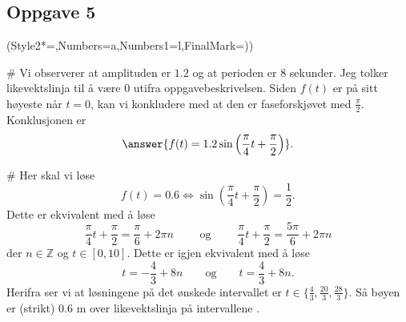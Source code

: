 \subsection*{Oppgave 5}
\begin{easylist}[enumerate]
	\ListProperties(Style2*=,Numbers=a,Numbers1=l,FinalMark={)})
	
	# Vi observerer at amplituden er $1.2$ og at perioden er $8$ sekunder. 
	Jeg tolker likevektslinja til å være $0$ utifra oppgavebeskrivelsen. 
	Siden $f(t)$ er på sitt høyeste når $t=0$, kan vi konkludere med at den er faseforskjøvet med $\frac{\pi}{2}$. 
	Konklusjonen er 
	\begin{equation*}
	\answer{f(t)=1.2\sin\left(\frac{\pi}{4}t + \frac{\pi}{2} \right)}.
	\end{equation*}
	
	
	# Her skal vi løse 
	\begin{equation*}
	f(t)=0.6 \Longleftrightarrow \sin\left(\frac\pi4 t + \frac\pi2 \right)=\frac12 .
	\end{equation*}
	Dette er ekvivalent med å løse 
	\begin{equation*}
	\frac\pi4 t + \frac\pi2 = \frac\pi6 + 2\pi n \qquad \text{ og } \qquad \frac\pi4 t + \frac\pi2 = \frac{5\pi}{6} + 2\pi n
	\end{equation*}
	der $n \in \mathbb{Z}$ og $t \in [0,10]$. 
	Dette er igjen ekvivalent med å løse 
	\begin{equation*}
	t=-\frac{4}{3} + 8n \qquad \text{og} \qquad t=\frac43 + 8n.
	\end{equation*}
	Herifra ser vi at løsningene på det ønskede intervallet er $t\in\{\frac43, \frac{20}{3},\frac{28}{3}\}$.
	Så bøyen er (strikt) 0.6 m over likevektslinja på intervallene .
\end{easylist}


